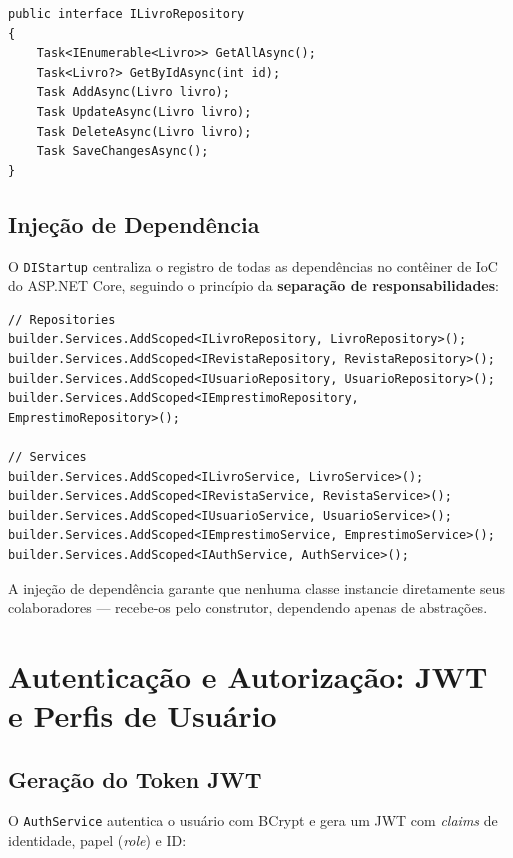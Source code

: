 \documentclass[
  12pt,
  a4paper,
  oneside,
  brazil
]{abntex2}
\begin{document}
\begin{lstlisting}[style=csharp, caption={Interface de contrato para o repositório de livros}, label=lst:ilivrorepository]
public interface ILivroRepository
{
    Task<IEnumerable<Livro>> GetAllAsync();
    Task<Livro?> GetByIdAsync(int id);
    Task AddAsync(Livro livro);
    Task UpdateAsync(Livro livro);
    Task DeleteAsync(Livro livro);
    Task SaveChangesAsync();
}
\end{lstlisting}

\subsection{Injeção de Dependência}

O \texttt{DIStartup} centraliza o registro de todas as dependências no contêiner de IoC do ASP.NET Core, seguindo o princípio da \textbf{separação de responsabilidades}:

\begin{lstlisting}[style=csharp, caption={Registro de dependências em DIStartup.cs}, label=lst:di]
// Repositories
builder.Services.AddScoped<ILivroRepository, LivroRepository>();
builder.Services.AddScoped<IRevistaRepository, RevistaRepository>();
builder.Services.AddScoped<IUsuarioRepository, UsuarioRepository>();
builder.Services.AddScoped<IEmprestimoRepository, EmprestimoRepository>();

// Services
builder.Services.AddScoped<ILivroService, LivroService>();
builder.Services.AddScoped<IRevistaService, RevistaService>();
builder.Services.AddScoped<IUsuarioService, UsuarioService>();
builder.Services.AddScoped<IEmprestimoService, EmprestimoService>();
builder.Services.AddScoped<IAuthService, AuthService>();
\end{lstlisting}

A injeção de dependência garante que nenhuma classe instancie diretamente seus colaboradores — recebe-os pelo construtor, dependendo apenas de abstrações.

\section{Autenticação e Autorização: JWT e Perfis de Usuário}

\subsection{Geração do Token JWT}

O \texttt{AuthService} autentica o usuário com BCrypt e gera um JWT com \textit{claims} de identidade, papel (\textit{role}) e ID:
\end{document}
